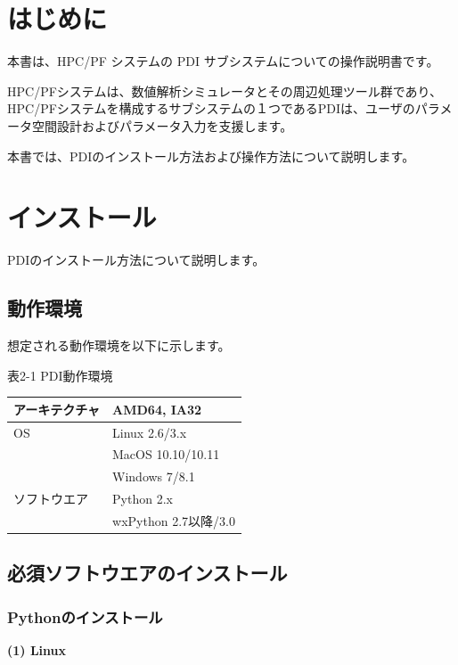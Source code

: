 \documentclass[a4paper,11pt]{jarticle}
\begin{document}
\newpage
\tableofcontents


\newpage
\section*{はじめに}

本書は、HPC/PF システムの PDI サブシステムについての操作説明書です。


HPC/PFシステムは、数値解析シミュレータとその周辺処理ツール群であり、HPC/PFシステムを構成するサブシステムの１つであるPDIは、ユーザのパラメータ空間設計およびパラメータ入力を支援します。


本書では、PDIのインストール方法および操作方法について説明します。

\newpage
\section{インストール}

\vspace{12pt}
PDIのインストール方法について説明します。

\subsection{動作環境}

想定される動作環境を以下に示します。

表2-1 PDI動作環境

\begin{tabular}{|l|l|}
\hline
アーキテクチャ & AMD64, IA32\\ \hline
OS & Linux 2.6/3.x\\
   & MacOS 10.10/10.11\\
   & Windows 7/8.1\\ \hline
ソフトウエア & Python 2.x\\
             & wxPython 2.7以降/3.0\\ \hline
\end{tabular}

\subsection{必須ソフトウエアのインストール}

\subsubsection{Pythonのインストール}

\textbf{(1) Linux}
\end{document}
